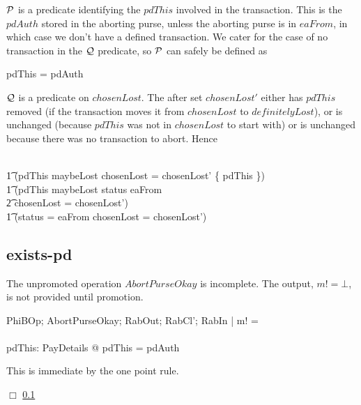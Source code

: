 $\mathcal{P}$ is a predicate identifying the $pdThis$ involved in
the transaction.  This is the $pdAuth$ stored in the aborting purse,
unless the aborting purse is in $eaFrom$, in which case we don't
have a defined transaction.  We cater for the case of no transaction
in the $\mathcal{Q}$ predicate, so $\mathcal{P}$ can safely be
defined as
\begin{gzed}
\pdThisPred \iff pdThis = pdAuth
\end{gzed}
$\mathcal{Q}$ is a predicate on $chosenLost$.  The after set
$chosenLost'$ either has $pdThis$ removed (if the transaction moves
it from $chosenLost$ to $definitelyLost$), or is unchanged (because
$pdThis$ was not in $chosenLost$ to start with) or is unchanged
because there was no transaction to abort.  Hence
\begin{gzed}
\chosenLostPred \iff
\\ %
\t1 (pdThis \in maybeLost \land chosenLost = chosenLost' \cup \{
pdThis \})
\\ %
\t1 \lor (pdThis \notin maybeLost \land status \neq eaFrom \land
\null
\\ %
\t2 chosenLost = chosenLost')
\\ %
\t1 \lor (status = eaFrom \land chosenLost = chosenLost')
\end{gzed}
\subsection{exists-pd}
\label{abort-exists-pd}
The unpromoted operation $AbortPurseOkay$ is incomplete.  The
output, $m! = \bot$, is not provided until promotion.
\begin{gzed}
  PhiBOp; AbortPurseOkay; RabOut; RabCl'; RabIn | m! = \bot
  \\ %
  \shows
  \\ %
  \exists pdThis: PayDetails @ pdThis = pdAuth
\end{gzed}
This is immediate by the one point rule.

$\Box$ \ref{abort-exists-pd}
